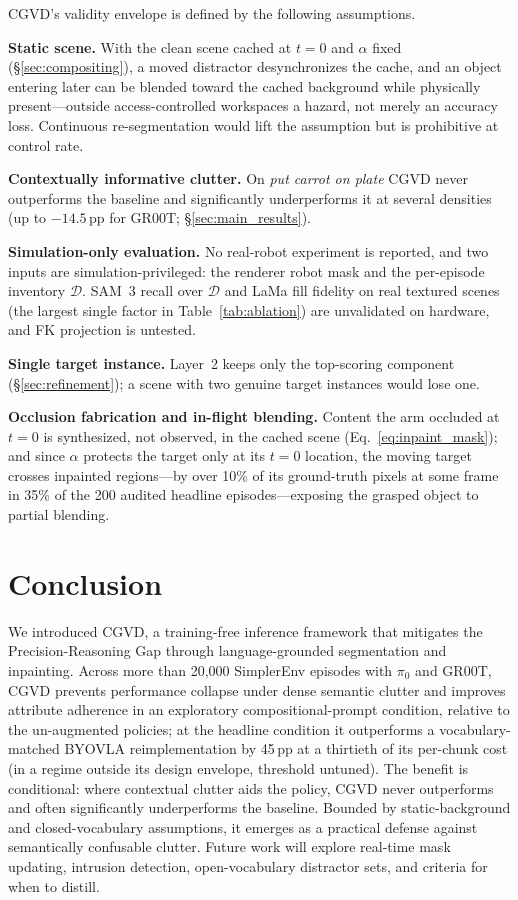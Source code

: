 \documentclass[letterpaper, 10 pt, conference]{ieeeconf}  %
\begin{document}
CGVD's validity envelope is defined by the following assumptions.

\textbf{Static scene.} With the clean scene cached at $t{=}0$ and $\alpha$ fixed (\S\ref{sec:compositing}), a moved distractor desynchronizes the cache, and an object entering later can be blended toward the cached background while physically present---outside access-controlled workspaces a hazard, not merely an accuracy loss. Continuous re-segmentation would lift the assumption but is prohibitive at control rate.

\textbf{Contextually informative clutter.} On \textit{put carrot on plate} CGVD never outperforms the baseline and significantly underperforms it at several densities (up to $-14.5$\,pp for GR00T; \S\ref{sec:main_results}).

\textbf{Simulation-only evaluation.} No real-robot experiment is reported, and two inputs are simulation-privileged: the renderer robot mask and the per-episode inventory $\mathcal{D}$. SAM~3 recall over $\mathcal{D}$ and LaMa fill fidelity on real textured scenes (the largest single factor in Table~\ref{tab:ablation}) are unvalidated on hardware, and FK projection is untested.

\textbf{Single target instance.} Layer~2 keeps only the top-scoring component (\S\ref{sec:refinement}); a scene with two genuine target instances would lose one.

\textbf{Occlusion fabrication and in-flight blending.} Content the arm occluded at $t{=}0$ is synthesized, not observed, in the cached scene (Eq.~\ref{eq:inpaint_mask}); and since $\alpha$ protects the target only at its $t{=}0$ location, the moving target crosses inpainted regions---by over 10\% of its ground-truth pixels at some frame in 35\% of the 200 audited headline episodes---exposing the grasped object to partial blending.

\section{Conclusion}
We introduced CGVD, a training-free inference framework that mitigates the Precision-Reasoning Gap through language-grounded segmentation and inpainting. Across more than 20{,}000 SimplerEnv episodes with $\pi_0$ and GR00T, CGVD prevents performance collapse under dense semantic clutter and improves attribute adherence in an exploratory compositional-prompt condition, relative to the un-augmented policies; at the headline condition it outperforms a vocabulary-matched BYOVLA reimplementation by 45\,pp at a thirtieth of its per-chunk cost (in a regime outside its design envelope, threshold untuned). The benefit is conditional: where contextual clutter aids the policy, CGVD never outperforms and often significantly underperforms the baseline. Bounded by static-background and closed-vocabulary assumptions, it emerges as a practical defense against semantically confusable clutter. Future work will explore real-time mask updating, intrusion detection, open-vocabulary distractor sets, and criteria for when to distill.
\end{document}
